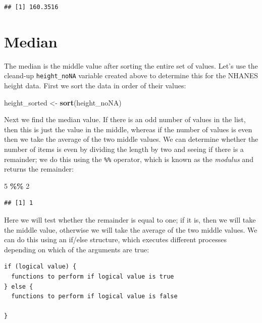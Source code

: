 \documentclass[
  12pt,
]{book}
\newenvironment{Shaded}{\begin{snugshade}}{\end{snugshade}}
\newcommand{\DecValTok}[1]{\textcolor[rgb]{0.00,0.00,0.81}{#1}}
\newcommand{\FunctionTok}[1]{\textcolor[rgb]{0.13,0.29,0.53}{\textbf{#1}}}
\newcommand{\NormalTok}[1]{#1}
\newcommand{\OtherTok}[1]{\textcolor[rgb]{0.56,0.35,0.01}{#1}}
\newcommand{\SpecialCharTok}[1]{\textcolor[rgb]{0.81,0.36,0.00}{\textbf{#1}}}
\begin{document}
\begin{verbatim}
## [1] 160.3516
\end{verbatim}

\hypertarget{median}{%
\section{Median}\label{median}}

The median is the middle value after sorting the entire set of values. Let's use the cleand-up \texttt{height\_noNA} variable created above to determine this for the NHANES height data. First we sort the data in order of their values:

\begin{Shaded}
\begin{Highlighting}[]
\NormalTok{height\_sorted }\OtherTok{\textless{}{-}} \FunctionTok{sort}\NormalTok{(height\_noNA)}
\end{Highlighting}
\end{Shaded}

Next we find the median value. If there is an odd number of values in the list, then this is just the value in the middle, whereas if the number of values is even then we take the average of the two middle values. We can determine whether the number of items is even by dividing the length by two and seeing if there is a remainder; we do this using the \texttt{\%\%} operator, which is known as the \emph{modulus} and returns the remainder:

\begin{Shaded}
\begin{Highlighting}[]
\DecValTok{5} \SpecialCharTok{\%\%} \DecValTok{2}
\end{Highlighting}
\end{Shaded}

\begin{verbatim}
## [1] 1
\end{verbatim}

Here we will test whether the remainder is equal to one; if it is, then we will take the middle value, otherwise we will take the average of the two middle values. We can do this using an if/else structure, which executes different processes depending on which of the arguments are true:

\begin{verbatim}
if (logical value) {
  functions to perform if logical value is true
} else {
  functions to perform if logical value is false

}
\end{verbatim}
\end{document}
